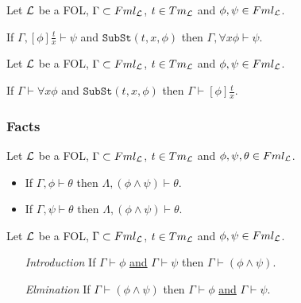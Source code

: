 \documentclass[11pt,a4paper]{article}
\begin{document}
Let $\mathcal{L}$ be a FOL, $\Gamma\subset Fml_{\mathcal{L}}$, $t\in Tm_{\mathcal{L}}$ and $\phi,\psi\in Fml_{\mathcal{L}}$.
\begin{center}If $\Gamma,[\phi]\frac{t}x\vdash\psi$ and $\mathtt{SubSt}(t,x,\phi)$ then $\Gamma,\forall x\phi\vdash\psi$.\end{center}

Let $\mathcal{L}$ be a FOL, $\Gamma\subset Fml_{\mathcal{L}}$, $t\in Tm_{\mathcal{L}}$ and $\phi,\psi\in Fml_{\mathcal{L}}$.
\begin{center}
If $\Gamma\vdash\forall x\phi$ and $\mathtt{SubSt}(t,x,\phi)$ then $\Gamma\vdash[\phi]\frac{t}x$.
\end{center}

\subsubsection{Facts}


\proposition{$\vdash(\phi\to\theta)\to((\psi\to\theta)\to((\phi\vee\psi)\to\theta))$}

\proposition{$\vdash((\phi\wedge\psi)\to\phi)$}

\proposition{$\vdash((\phi\wedge\psi)\to\psi)$}

\proposition{$\vdash(\phi\to(\psi\to(\phi\wedge\psi)))$}

Let $\mathcal{L}$ be a FOL, $\Gamma\subset Fml_{\mathcal{L}}$, $t\in Tm_{\mathcal{L}}$ and $\phi,\psi,\theta\in Fml_{\mathcal{L}}$.
\begin{itemize}
	\item If $\Gamma,\phi\vdash\theta$ then $\Lambda,(\phi\wedge\psi)\vdash\theta$.
	\item If $\Gamma,\psi\vdash\theta$ then $\Lambda,(\phi\wedge\psi)\vdash\theta$.
\end{itemize}

Let $\mathcal{L}$ be a FOL, $\Gamma\subset Fml_{\mathcal{L}}$, $t\in Tm_{\mathcal{L}}$ and $\phi,\psi\in Fml_{\mathcal{L}}$.
\begin{itemize}
	\item[\textit{Introduction}] If $\Gamma\vdash\phi$ \underline{and} $\Gamma\vdash\psi$ then $\Gamma\vdash(\phi\wedge\psi)$.
	\item[\textit{Elmination}] If $\Gamma\vdash(\phi\wedge\psi)$ then $\Gamma\vdash\phi$ \underline{and} $\Gamma\vdash\psi$.
\end{itemize}
\end{document}
